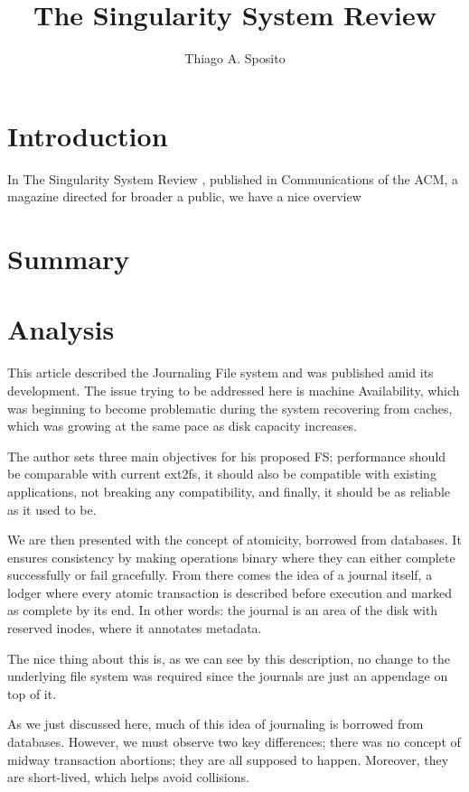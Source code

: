 \documentclass[12pt]{article}
\title{The Singularity System Review}
\author{Thiago A. Sposito\inst{1} }
\begin{document}
 

\maketitle


\section{Introduction}

In The Singularity System Review \cite{larus2010singularity}, published in Communications of the ACM, a magazine directed for broader a public, we have a nice overview

\section{Summary}


\section{Analysis}
This article described the Journaling File system and was published amid its development. The issue trying to be addressed here is machine Availability, which was beginning to become problematic during the system recovering from caches, which was growing at the same pace as disk capacity increases.

The author sets three main objectives for his proposed FS; performance should be comparable with current ext2fs, it should also be compatible with existing applications, not breaking any compatibility, and finally, it should be as reliable as it used to be.

We are then presented with the concept of atomicity, borrowed from databases. It ensures consistency by making operations binary where they can either complete successfully or fail gracefully. From there comes the idea of a journal itself, a lodger where every atomic transaction is described before execution and marked as complete by its end. In other words: the journal is an area of the disk with reserved inodes, where it annotates metadata.

The nice thing about this is, as we can see by this description, no change to the underlying file system was required since the journals are just an appendage on top of it.

As we just discussed here, much of this idea of journaling is borrowed from databases. However, we must observe two key differences; there was no concept of midway transaction abortions; they are all supposed to happen. Moreover, they are short-lived, which helps avoid collisions.
\end{document}
